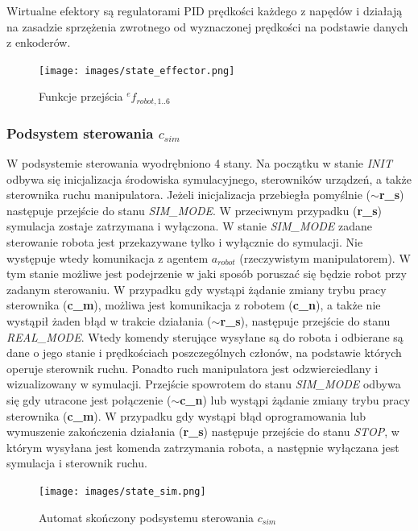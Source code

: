 \documentclass[a4paper, 12pt, twoside]{article}
\begin{document}
Wirtualne efektory są regulatorami PID prędkości każdego z napędów i działają na zasadzie sprzężenia zwrotnego od wyznaczonej prędkości na podstawie danych z enkoderów.

\begin{figure}[hbt!]
\centering
\texttt{[image: images/state\_effector.png]}
\caption{Funkcje przejścia $^ef_{robot,1..6}$ }
\label{fig:state_effector}
\end{figure}

\subsubsection{Podsystem sterowania $c_{sim}$}

W podsystemie sterowania wyodrębniono 4 stany. Na początku w stanie \textit{INIT} odbywa się inicjalizacja środowiska symulacyjnego, sterowników urządzeń, a także sterownika ruchu manipulatora. 
Jeżeli inicjalizacja przebiegła pomyślnie (\textbf{$\sim$r\_s}) następuje przejście do stanu \textit{SIM\_MODE}. W przeciwnym przypadku (\textbf{r\_s}) symulacja zostaje zatrzymana i wyłączona. W stanie \textit{SIM\_MODE} zadane sterowanie robota jest przekazywane tylko i wyłącznie do symulacji. Nie występuje wtedy komunikacja z agentem $a_{robot}$ (rzeczywistym manipulatorem). W tym stanie możliwe jest podejrzenie w jaki sposób poruszać się będzie robot przy zadanym sterowaniu. W przypadku gdy wystąpi żądanie zmiany trybu pracy sterownika (\textbf{c\_m}), możliwa jest komunikacja z robotem (\textbf{c\_n}), a także nie wystąpił żaden błąd w trakcie działania (\textbf{$\sim$r\_s}), następuje przejście do stanu \textit{REAL\_MODE}. Wtedy komendy sterujące wysyłane są do robota i odbierane są dane o jego stanie i prędkościach poszczególnych członów, na podstawie których operuje sterownik ruchu. Ponadto ruch manipulatora jest odzwierciedlany i wizualizowany w symulacji. Przejście spowrotem do stanu \textit{SIM\_MODE} odbywa się gdy utracone jest połączenie (\textbf{$\sim$c\_n}) lub wystąpi żądanie zmiany trybu pracy sterownika (\textbf{c\_m}). W przypadku gdy wystąpi błąd oprogramowania lub wymuszenie zakończenia działania (\textbf{r\_s}) następuje przejście do stanu \textit{STOP}, w którym wysyłana jest komenda zatrzymania robota, a następnie wyłączana jest symulacja i sterownik ruchu.

\begin{figure}[hbt!]
\centering
\texttt{[image: images/state\_sim.png]}
\caption{Automat skończony podsystemu sterowania $c_{sim}$}
\label{fig:state_sim}
\end{figure}
\end{document}
